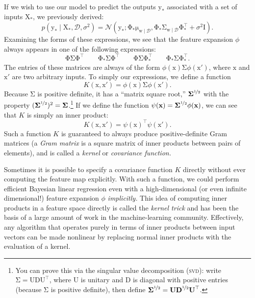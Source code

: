 \documentclass{article}
\newcommand{\acro}[1]{\textsc{\MakeLowercase{#1}}}
\newcommand{\given}{\mid}
\newcommand{\mc}[1]{\mathcal{#1}}
\newcommand{\data}{\mc{D}}
\newcommand{\trans}{^\top}
\newcommand{\mat}[1]{\bm{\mathrm{#1}}}
\renewcommand{\vec}[1]{\bm{\mathrm{#1}}}
\begin{document}
If we wish to use our model to predict the outputs $\vec{y}_\ast$
associated with a set of inputs $\mat{X}_\ast$, we previously derived:
\begin{equation*}
  p(\vec{y}_\ast \given \mat{X}_\ast, \data, \sigma^2)
  =
  \mc{N}(
  \vec{y}_\ast;
  \mat{\Phi}_\ast \vec{\mu}_{\vec{w}\given\data},
  \mat{\Phi}_\ast \mat{\Sigma}_{\vec{w}\given\data} \mat{\Phi}_\ast\trans + \sigma^2 \mat{I}).
\end{equation*}
Examining the forms of these expressions, we see that the feature
expansion $\phi$ always appears in one of the following expressions:
\begin{equation*}
  \mat{\Phi}\mat{\Sigma}\mat{\Phi}\trans
  \qquad
  \mat{\Phi}_\ast\mat{\Sigma}\mat{\Phi}\trans
  \qquad
  \mat{\Phi}\mat{\Sigma}\mat{\Phi}_\ast\trans
  \qquad
  \mat{\Phi}_\ast\mat{\Sigma}\mat{\Phi}_\ast\trans.
\end{equation*}
The entries of these matrices are always of the form $\phi(\vec{x})
\mat{\Sigma} \phi(\vec{x}')$, where $\vec{x}$ and $\vec{x}'$ are two
arbitrary inputs.  To simply our expressions, we define a function
\begin{equation*}
  K(\vec{x}, \vec{x}')
  =
  \phi(\vec{x})\mat{\Sigma}\phi(\vec{x}').
\end{equation*}
Because $\mat{\Sigma}$ is positive definite, it has a ``matrix square
root,'' $\mat{\Sigma}^{\nicefrac{1}{2}}$ with the property
$(\mat{\Sigma}^{\nicefrac{1}{2}})^2 = \mat{\Sigma}$.\footnote{You can
  prove this via the singular value decomposition (\acro{SVD}): write
  $\mat{\Sigma} = \mat{U}\mat{D}\mat{U}\trans$, where $\mat{U}$ is
  unitary and $\mat{D}$ is diagonal with positive entries (because
  $\mat{\Sigma}$ is positive definite), then define
  $\mat{\Sigma}^{\nicefrac{1}{2}} =
  \mat{U}\mat{D}^{\nicefrac{1}{2}}\mat{U}\trans$.} If we define the
function $\psi(\vec{x}) =
\mat{\Sigma}^{\nicefrac{1}{2}}\phi(\vec{x})$, we can see that
$K$ is simply an inner product:
\begin{equation*}
  K(\vec{x}, \vec{x}')
  =
  \psi(\vec{x})\trans \psi(\vec{x}').
\end{equation*}
Such a function $K$ is guaranteed to always produce positive-definite
Gram matrices (a \emph{Gram matrix} is a square matrix of inner
products between pairs of elements), and is called a \emph{kernel} or
\emph{covariance function.}

Sometimes it is possible to specify a covariance function $K$ directly
without ever computing the feature map explicitly.  With such a
function, we could perform efficient Bayesian linear regression even
with a high-dimensional (or even infinite dimensional!) feature
expansion $\phi$ \emph{implicitly.} This idea of computing inner
products in a feature space directly is called the \emph{kernel trick}
and has been the basis of a large amount of work in the
machine-learning community.  Effectively, any algorithm that operates
purely in terms of inner products between input vectors can be made
nonlinear by replacing normal inner products with the evaluation of a
kernel.
\end{document}
